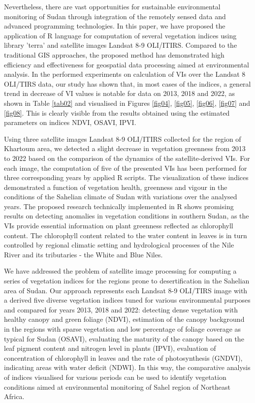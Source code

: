 \documentclass[jimaging,article,submit,pdftex,moreauthors]{Definitions/mdpi}
\begin{document}
Nevertheless, there are vast opportunities for sustainable environmental monitoring of Sudan through integration of the remotely sensed data and advanced programming technologies. In this paper, we have proposed the application of R language for computation of several vegetation indices using library 'terra' and satellite images Landsat 8-9 OLI/ITIRS. Compared to the traditional GIS approaches, the proposed method has demonstrated high efficiency and effectiveness for geospatial data processing aimed at environmental analysis. In the performed experiments on calculation of VIs over the Landsat 8 OLI/TIRS data, our study has shown that, in most cases of the indices, a general trend in decrease of VI values is notable for data on 2013, 2018 and 2022, as shown in Table \ref{tab02} and visualised in Figures \ref{fig04}, \ref{fig05}, \ref{fig06}, \ref{fig07} and \ref{fig08}. This is clearly visible from the results obtained using the estimated parameters on indices NDVI, OSAVI, IPVI. 

Using three satellite images Landsat 8-9 OLI/ITIRS collected for the region of Khartoum area, we detected a slight decrease in vegetation greenness from 2013 to 2022 based on the comparison of the dynamics of the satellite-derived VIs. For each image, the computation of five of the presented VIs has been performed for three corresponding years by applied R scripts. The visualization of these indices demonstrated a function of vegetation health, greenness and vigour in the conditions of the Sahelian climate of Sudan with variations over the analysed years. The proposed research technically implemented in R shows promising results on detecting anomalies in vegetation conditions in southern Sudan, as the VIs provide essential information on plant greenness reflected as chlorophyll content. The chlorophyll content related to the water content in leaves is in turn controlled by regional climatic setting and hydrological processes of the Nile River and its tributaries - the White and Blue Niles. 

We have addressed the problem of satellite image processing for computing a series of vegetation indices for the regions prone to desertification in the Sahelian area of Sudan. Our approach represents each Landsat 8-9 OLI/TIRS image with a derived five diverse vegetation indices tuned for various environmental purposes and compared for years 2013, 2018 and 2022: detecting dense vegetation with healthy canopy and green foliage (NDVI), estimation of the canopy background in the regions with sparse vegetation and low percentage of foliage coverage as typical for Sudan (OSAVI), evaluating the maturity of the canopy based on the leaf pigment content and nitrogen level in plants (IPVI), evaluation of concentration of chlorophyll in leaves and the rate of photosynthesis (GNDVI), indicating areas with water deficit (NDWI). In this way, the comparative analysis of indices visualised for various periods can be used to identify vegetation conditions aimed at environmental monitoring of Sahel region of Northeast Africa.
\end{document}
